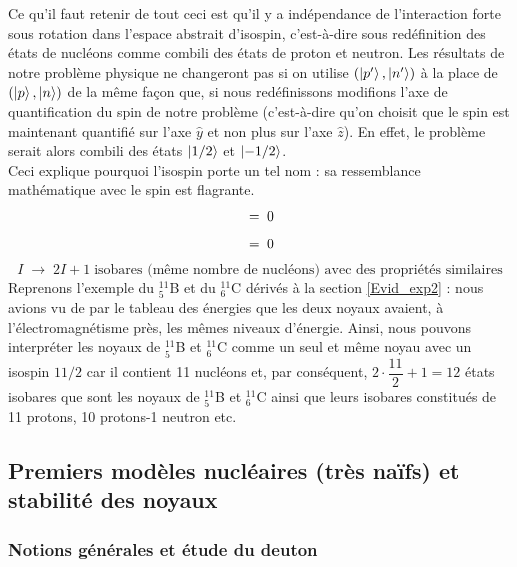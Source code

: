 Ce qu'il faut retenir de tout ceci est qu'il y a indépendance de l'interaction forte sous rotation dans l'espace abstrait d'isospin, c'est-à-dire sous redéfinition des états de nucléons comme combili des états de proton et neutron. Les résultats de notre problème physique ne changeront pas si on utilise $(\ket{p'},\ket{n'})$ à la place de $(\ket{p},\ket{n})$ de la même façon que, si nous redéfinissons modifions l'axe de quantification du spin de notre problème (c'est-à-dire qu'on choisit que le spin est maintenant quantifié sur l'axe $\hat{y}$ et non plus sur l'axe $\hat{z}$). En effet, le problème serait alors combili des états $\ket{1/2}$ et $\ket{-1/2}$.\\
Ceci explique pourquoi l'isospin porte un tel nom : sa ressemblance mathématique avec le spin est flagrante.\\
\begin{equation*}
    [I_z,H] \eq 0
\end{equation*}
\begin{equation*}
    [I^2,H] \eq 0
\end{equation*}
\begin{equation*}
    I \; \longrightarrow\; 2I+1 \; \text{isobares (même nombre de nucléons) avec des propriétés similaires}
\end{equation*}
Reprenons l'exemple du $^{11}_5$B et du $^{11}_6$C dérivés à la section \ref{Evid_exp2} : nous avions vu de par le tableau des énergies que les deux noyaux avaient, à l'électromagnétisme près, les mêmes niveaux d'énergie. Ainsi, nous pouvons interpréter les noyaux de $^{11}_5$B et $^{11}_6$C comme un seul et même noyau avec un isospin $11/2$ car il contient 11 nucléons et, par conséquent, $2\cdot\dfrac{11}{2}+1 = 12$ états isobares que sont les noyaux de $^{11}_5$B et $^{11}_6$C ainsi que leurs isobares constitués de 11 protons, 10 protons-1 neutron etc.








\subsection{Premiers modèles nucléaires (très naïfs) et stabilité des noyaux}
\subsubsection{Notions générales et étude du deuton}


